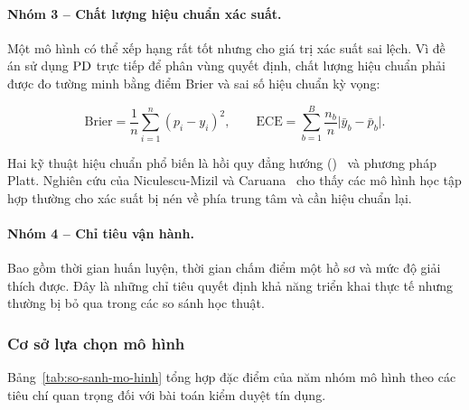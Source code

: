 \paragraph{Nhóm 3 -- Chất lượng hiệu chuẩn xác suất.} Một mô hình có thể xếp hạng
rất tốt nhưng cho giá trị xác suất sai lệch. Vì đề án sử dụng $\mathrm{PD}$ trực tiếp
để phân vùng quyết định, chất lượng hiệu chuẩn phải được đo tường minh bằng điểm
Brier và sai số hiệu chuẩn kỳ vọng:

\begin{equation}
\text{Brier} = \frac{1}{n}\sum_{i=1}^{n} (p_i - y_i)^2,
\qquad
\text{ECE} = \sum_{b=1}^{B} \frac{n_b}{n}
             \big| \bar{y}_b - \bar{p}_b \big|.
\label{eq:brier-ece}
\end{equation}

Hai kỹ thuật hiệu chuẩn phổ biến là hồi quy đẳng hướng ()~\cite{zadrozny2002} và phương pháp Platt. Nghiên cứu của
Niculescu-Mizil và Caruana~\cite{niculescu2005} cho thấy các mô hình học tập hợp
thường cho xác suất bị nén về phía trung tâm và cần hiệu chuẩn lại.

\paragraph{Nhóm 4 -- Chỉ tiêu vận hành.} Bao gồm thời gian huấn luyện, thời gian
chấm điểm một hồ sơ và mức độ giải thích được. Đây là những chỉ tiêu quyết định
khả năng triển khai thực tế nhưng thường bị bỏ qua trong các so sánh học thuật.

\subsubsection{Cơ sở lựa chọn mô hình}

Bảng~\ref{tab:so-sanh-mo-hinh} tổng hợp đặc điểm của năm nhóm mô hình theo các
tiêu chí quan trọng đối với bài toán kiểm duyệt tín dụng.

